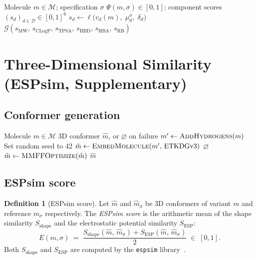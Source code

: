 \documentclass[11pt, a4paper]{article}
\theoremstyle{definition}
\newtheorem{definition}{Definition}[section]
\newcommand{\1}[1]{\mathbf{1}\!\left[#1\right]}   %
\newcommand{\Geo}{\mathcal{G}}                      %
\newcommand{\Desc}{\mathcal{D}}                     %
\begin{document}
\begin{algorithm}[H]
\caption{\textsc{Desirability}$(m, \sigma)$ --- physicochemical conservation score}
\label{alg:desirability}
\begin{algorithmic}[1]
\Require Molecule $m \in \mathcal{M}$; specification $\sigma$
\Ensure  $\Psi(m, \sigma) \in [0, 1]$;
         component scores $(s_d)_{d \in \Desc} \in [0,1]^6$
\For{$d \in \Desc$}
  \State $s_d \leftarrow \ell\!\bigl(v_d(m),\; \mu_d^\sigma,\; \delta_d\bigr)$
\EndFor
\Return $\Geo(s_{\text{MW}},\, s_{\text{CLogP}},\, s_{\text{TPSA}},\,
             s_{\text{HBD}},\, s_{\text{HBA}},\, s_{\text{RB}})$
\end{algorithmic}
\end{algorithm}


\section{Three-Dimensional Similarity (ESPsim, Supplementary)}
\label{sec:espsim}

\subsection{Conformer generation}

\begin{algorithm}[H]
\caption{\textsc{ETKDG}$(m)$ --- generate a 3D conformer}
\label{alg:etkdg}
\begin{algorithmic}[1]
\Require Molecule $m \in \mathcal{M}$
\Ensure  3D conformer $\hat{m}$, or $\varnothing$ on failure
\State $m' \leftarrow \textsc{AddHydrogens}(m)$
\State Set random seed to 42
\State $\hat{m} \leftarrow \textsc{EmbedMolecule}(m',\, \text{ETKDGv3})$
 \Return $\varnothing$ \EndIf
\State $\hat{m} \leftarrow \textsc{MMFFOptimize}(\hat{m})$
\Return $\hat{m}$
\end{algorithmic}
\end{algorithm}

\subsection{ESPsim score}

\begin{definition}[ESPsim score]
\label{def:espsim}
Let $\hat{m}$ and $\hat{m}_\sigma$ be 3D conformers of variant $m$ and
reference $m_\sigma$ respectively.
The \emph{ESPsim score} is the arithmetic mean of the shape similarity
$S_\text{shape}$ and the electrostatic potential similarity $S_\text{ESP}$:
\[
  E(m, \sigma)
  \;=\; \frac{S_\text{shape}(\hat{m},\, \hat{m}_\sigma)
              + S_\text{ESP}(\hat{m},\, \hat{m}_\sigma)}{2}
  \;\in\; [0, 1].
\]
Both $S_\text{shape}$ and $S_\text{ESP}$ are computed by the
\texttt{espsim} library~\cite{espsim}.
\end{definition}
\end{document}
